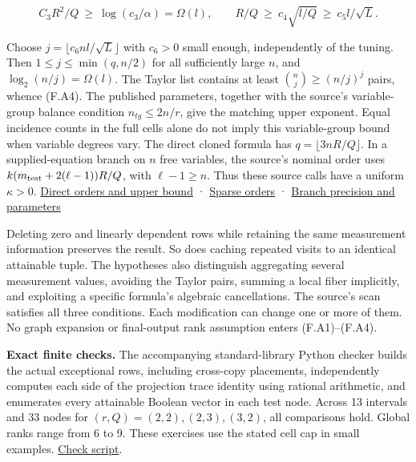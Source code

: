 \documentclass[
  11pt,
]{article}
\begin{document}
\[
   C_3 R^2/Q \ \ge\ \log(c_3/\alpha)=\Omega(l),
   \qquad R/Q\ \ge\ c_4 \sqrt{l/Q}\ \ge\ c_5 l/\sqrt L .
\]

Choose \(j=\lfloor c_6 n l/\sqrt L\rfloor\) with \(c_6>0\) small enough,
independently of the tuning. Then \(1\le j\le\min(q,n/2)\) for all
sufficiently large \(n\), and \(\log_2(n/j)=\Omega(l)\). The Taylor list
contains at least \(\binom{n}{j}\ge (n/j)^j\) pairs, whence (F.A4). The
published parameters, together with the source's variable-group
balance condition \(n_{tg}\le 2n/r\), give the matching upper
exponent. Equal incidence counts in the full cells alone do not
imply this variable-group bound when variable degrees vary.
The direct cloned
formula has \(q=\lfloor3nR/Q\rfloor\). In a supplied-equation branch on
\(n\) free variables, the source's nominal order uses
\(k(m_{\rm test}+2(\ell-1))R/Q\), with \(\ell-1\ge n\). Thus these
source calls have a uniform \(\kappa>0\).
\href{https://github.com/openai/math/blob/main/preprints/The-Exponential-Time-Hypothesis-is-False-October-25-2026/build/main_full_version.tex\#L965-L1017}{Direct
orders and upper bound} ·
\href{https://github.com/openai/math/blob/main/preprints/The-Exponential-Time-Hypothesis-is-False-October-25-2026/build/main_full_version.tex\#L3014-L3055}{Sparse
orders} ·
\href{https://github.com/openai/math/blob/main/preprints/The-Exponential-Time-Hypothesis-is-False-October-25-2026/build/main_full_version.tex\#L3142-L3196}{Branch
precision and parameters}

Deleting zero and linearly dependent rows while retaining the same
measurement information preserves the result. So does caching repeated
visits to an identical attainable tuple. The hypotheses also distinguish
aggregating several measurement values, avoiding the Taylor pairs,
summing a local fiber implicitly, and exploiting a specific formula's
algebraic cancellations. The source's scan satisfies all three
conditions. Each modification can change one or more of them. No graph
expansion or final-output rank assumption enters (F.A1)--(F.A4).

\textbf{Exact finite checks.} The accompanying standard-library Python
checker builds the actual exceptional rows, including cross-copy
placements, independently computes each side of the projection trace
identity using rational arithmetic, and enumerates every attainable
Boolean vector in each test node. Across 13 intervals and 33 nodes for
\((r,Q)=(2,2),(2,3),(3,2)\), all comparisons hold. Global ranks range
from 6 to 9. These exercises use the stated cell cap in small examples.
\href{https://github.com/dch-and-Elara/some-research-inspired-by-openais-eth-preprint/tree/main/rank-budget-barriers}{Check
script}.
\end{document}
